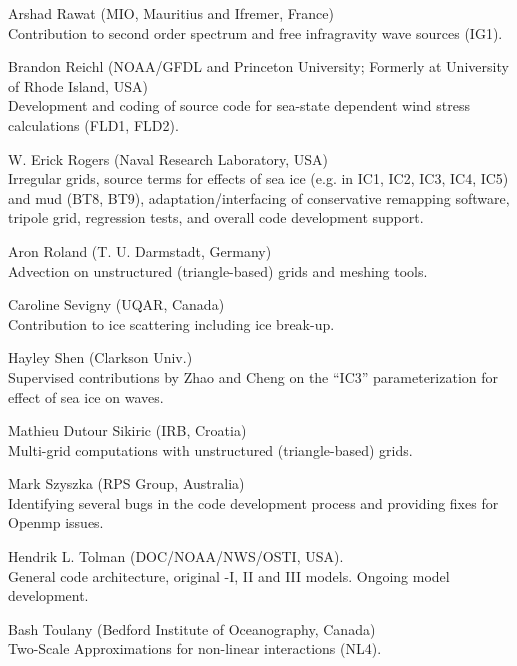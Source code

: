 \begin{list}{\ldots}{ }
\item [Arshad Rawat] (MIO, Mauritius and Ifremer, France) \\
  Contribution to second order spectrum and free infragravity wave sources (IG1).    

\item [Brandon Reichl] (NOAA/GFDL and Princeton University; Formerly at University of Rhode Island, USA) \\
  Development and coding of source code for sea-state dependent wind stress calculations (FLD1, FLD2).

\item [W. Erick Rogers]  (Naval Research Laboratory, USA)\\ 
  Irregular grids, source terms for effects of sea ice (e.g. in IC1, IC2, IC3, IC4, IC5) and mud (BT8, BT9), adaptation/interfacing of conservative remapping software, tripole grid, regression tests, and overall code development support.

\item [Aron Roland] (T. U. Darmstadt, Germany) \\
  Advection on unstructured (triangle-based) grids and meshing tools.

\item [Caroline Sevigny] (UQAR, Canada) \\
  Contribution to ice scattering including ice break-up.

\item [Hayley Shen] (Clarkson Univ.) \\
  Supervised contributions by Zhao and Cheng on the ``IC3'' parameterization for effect of sea ice on waves.

\item [Mathieu Dutour Sikiric] (IRB, Croatia) \\
  Multi-grid computations with unstructured (triangle-based) grids.

\item [Mark Szyszka] (RPS Group, Australia) \\
  Identifying several bugs in the code development process and providing fixes for Openmp issues.

\item [Hendrik L. Tolman] (DOC/NOAA/NWS/OSTI, USA). \\
  General code architecture, original \wt-I, II and III models. Ongoing model
  development.

\item [Bash Toulany] (Bedford Institute of Oceanography, Canada)\\
 Two-Scale Approximations for non-linear interactions (NL4).


\end{list}
